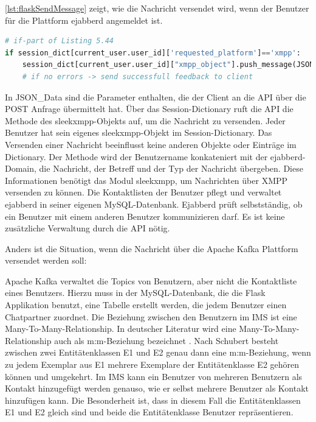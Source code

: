 \documentclass[a4paper,titlepage,halfparskip,12pt]{scrreprt}
\begin{document}
\begin{onehalfspacing}
\autoref{lst:flaskSendMessage} zeigt, wie die Nachricht versendet wird, wenn der Benutzer für die Plattform ejabberd angemeldet ist.

\begin{lstlisting}[language=python, caption={Code für den Versand einer Nachricht über die \acs{API} an ejabberd}, label={lst:flaskSendMessage}]
# if-part of Listing 5.44
if session_dict[current_user.user_id]['requested_platform']=='xmpp':
    session_dict[current_user.user_id]["xmpp_object"].push_message(JSON_Data["to"]+"@ejabberd-server", JSON_Data["msg_body"], JSON_Data["msg_subject"], JSON_Data["msg_type"])
    # if no errors -> send successfull feedback to client
\end{lstlisting}


In {JSON\_Data} sind die Parameter enthalten, die der Client an die \acs{API} über die POST Anfrage übermittelt hat.
Über das Session-Dictionary ruft die \acs{API} die Methode des sleekxmpp-Objekts auf, um die Nachricht zu versenden. Jeder Benutzer hat sein eigenes sleekxmpp-Objekt im Session-Dictionary. Das Versenden einer Nachricht beeinflusst keine anderen Objekte oder Einträge im Dictionary. Der Methode wird der Benutzername konkateniert mit der ejabberd-Domain, die Nachricht, der Betreff und der Typ der Nachricht übergeben. Diese Informationen benötigt das Modul sleekxmpp, um Nachrichten über \acs{XMPP} versenden zu können. Die Kontaktlisten der Benutzer pflegt und verwaltet ejabberd in seiner eigenen MySQL-Datenbank. Ejabberd prüft selbstständig, ob ein Benutzer mit einem anderen Benutzer kommunizieren darf. Es ist keine zusätzliche Verwaltung durch die \acs{API} nötig.

Anders ist die Situation, wenn die Nachricht über die Apache Kafka Plattform versendet werden soll:

Apache Kafka verwaltet die Topics von Benutzern, aber nicht die Kontaktliste eines Benutzers. Hierzu muss in der MySQL-Datenbank, die die Flask Applikation benutzt, eine Tabelle erstellt werden, die jedem Benutzer einen Chatpartner zuordnet. Die Beziehung zwischen den Benutzern im \acs{IMS} ist eine Many-To-Many-Relationship. In deutscher Literatur wird eine Many-To-Many-Relationship auch als m:m-Beziehung bezeichnet \cite{Schubert2007}. Nach Schubert \cite{Schubert2007} besteht zwischen zwei Entitätenklassen E1 und E2 genau dann eine m:m-Beziehung, wenn zu jedem Exemplar aus E1 mehrere Exemplare der Entitätenklasse E2 gehören können und umgekehrt. Im \acs{IMS} kann ein Benutzer von mehreren Benutzern als Kontakt hinzugefügt werden genauso, wie er selbst mehrere Benutzer als Kontakt hinzufügen kann. Die Besonderheit ist, dass in diesem Fall die Entitätenklassen E1 und E2 gleich sind und beide die Entitätenklasse Benutzer repräsentieren.


\end{onehalfspacing}
\end{document}
